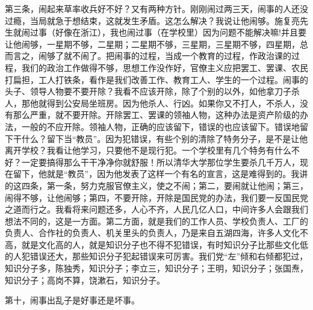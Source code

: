 第三条，闹起来草率收兵好不好？又有两种方针。刚刚闹过两三天，闹事的人还没过瘾，当局就急于想结束，这就发生矛盾。这怎么解决？我说让他闹够。施复亮先生就闹过事（好像在浙江），我也闹过事（在学校里）因为问题不能解决嘛!并且要让他闹够，一星期不够，二星期；二星期不够，三星期，三星期不够，四星期，总而言之，闹够了就不闹了。把闹事的过程，当成一个教育的过程，作政治课的过程，我们的政治工作做得不够，思想工作没作好，官僚主义应把罢工、罢课、农民打扁担，工人打铁条，看作是我们改善工作、教育工人、学生的一个过程。闹事的头子、领导人物要不要开除？我看不应该开除，除了个别的以外，如他拿刀子杀人，那他就得到公安局坐班房。因为他杀人、行凶。如果你又不打人，不杀人，没有那么严重，就不要开除。开除罢工、罢课的领袖人物，这种办法是资产阶级的办法，一般的不应开除。领袖人物，正确的应该留下，错误的也应该留下。错误地留下干什么？留下当“教员”。因为犯错误，有些个别的清除了特务分子，是不是让他离开学校？我看让他学习，只要他不是现行犯。一个学校里有几个特务有什么不好？一定要搞得那么干干净净你就舒服！所以清华大学那位学生要杀几千万人，现在留下，他就是“教员”，因为他发表了这样一个有名的宣言，这是难得到的。我讲的这四条，第一条，努力克服官僚主义，使之不闹；第二，要闹就让他闹；第三，闹得不够，让他闹够；第四，不要开除，开除是国民党的办法，我们要一反国民党之道而行之。我看将来问题还多，人心不齐，人民几亿人口，中间许多人会跟我们想法不同的，这是一方面。第二方面，就是我们的工作人员、学校负责人、工厂的负责人、合作社的负责人、机关里头的负责人，乃是来自五湖四海，许多人文化不高，就是文化高的人，就是知识分子也不得不犯错误，有时知识分子比那些文化低的人犯错误还大，那些知识分子犯起错误来可厉害。我们党“左”倾和右倾都犯过，知识分子多，陈独秀，知识分子；李立三，知识分子；王明，知识分子；张国焘，知识分子；高岗不算，饶漱石，知识分子。

第十，闹事出乱子是好事还是坏事。

